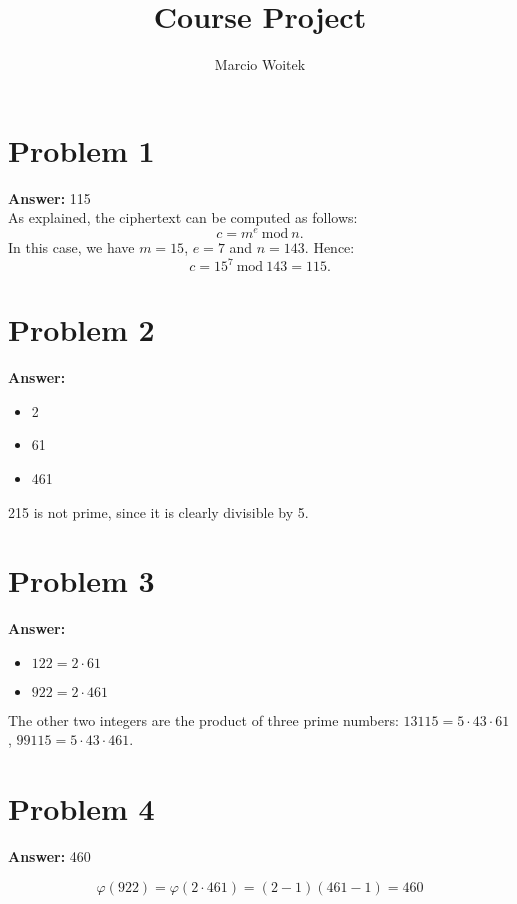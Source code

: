 \documentclass[11pt]{article}
\author{Marcio Woitek}
\date{}
\title{Course Project}
\newcommand{\Mod}{\mathrm{mod}\:}
\begin{document}
\maketitle
\thispagestyle{empty}
\pagestyle{empty}
\section*{Problem 1}
\label{sec:org42cf67b}
\textbf{Answer:} 115\\

As explained, the ciphertext can be computed as follows:
\begin{equation}
c=m^e\:\Mod n.
\end{equation}
In this case, we have \(m=15\), \(e=7\) and \(n=143\). Hence:
\begin{equation}
c=15^7\:\Mod 143=115.
\end{equation}
\section*{Problem 2}
\label{sec:orgc7fb934}
\textbf{Answer:}
\begin{itemize}
\item 2
\item 61
\item 461\\
\end{itemize}

215 is not prime, since it is clearly divisible by 5.
\section*{Problem 3}
\label{sec:org3492d2d}
\textbf{Answer:}
\begin{itemize}
\item \(122=2\cdot 61\)
\item \(922=2\cdot 461\)\\
\end{itemize}

The other two integers are the product of three prime numbers:
\(13115=5\cdot 43\cdot 61\), \(99115=5\cdot 43\cdot 461\).
\section*{Problem 4}
\label{sec:org05ba776}
\textbf{Answer:} 460

\begin{equation}
\varphi(922)=\varphi(2\cdot 461)=(2-1)(461-1)=460
\end{equation}
\end{document}
